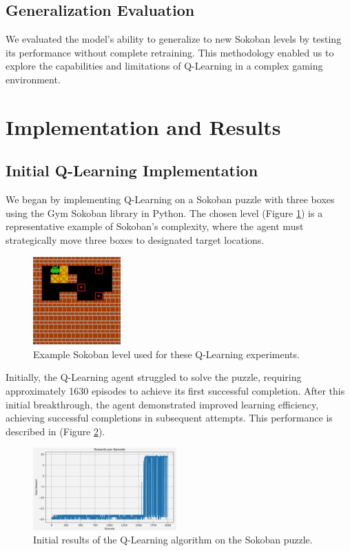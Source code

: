 \documentclass[10pt,twocolumn]{article}
\begin{document}
\subsection{Generalization Evaluation}

We evaluated the model's ability to generalize to new Sokoban levels by testing its performance without complete retraining. This methodology enabled us to explore the capabilities and limitations of Q-Learning in a complex gaming environment.

\section{Implementation and Results}

\subsection{Initial Q-Learning Implementation}

We began by implementing Q-Learning on a Sokoban puzzle with three boxes using the Gym Sokoban library in Python. The chosen level (Figure \ref{fig:sokoban_level}) is a representative example of Sokoban's complexity, where the agent must strategically move three boxes to designated target locations.

\begin{figure}[ht]
    \centering
    \includegraphics[width=0.3\textwidth]{Images/sokoban.png}
    \caption{Example Sokoban level used for these Q-Learning experiments.}
    \label{fig:sokoban_level}
\end{figure}

Initially, the Q-Learning agent struggled to solve the puzzle, requiring approximately 1630 episodes to achieve its first successful completion. After this initial breakthrough, the agent demonstrated improved learning efficiency, achieving successful completions in subsequent attempts. This performance is described in (Figure \ref{fig:initial_results}).

\begin{figure}[ht]
    \centering
    \includegraphics[width=0.49\textwidth]{Images/resultats_initial.png}
    \caption{Initial results of the Q-Learning algorithm on the Sokoban puzzle.}
    \label{fig:initial_results}
\end{figure}
\end{document}
